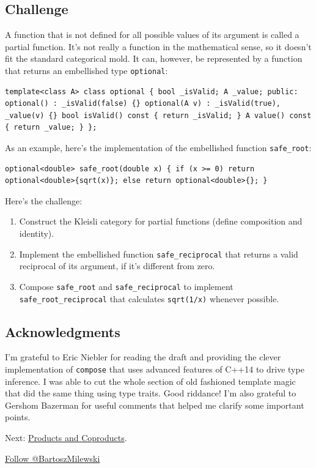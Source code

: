 \subsection{Challenge}\label{challenge}

A function that is not defined for all possible values of its argument
is called a partial function. It's not really a function in the
mathematical sense, so it doesn't fit the standard categorical mold. It
can, however, be represented by a function that returns an embellished
type \texttt{optional}:

\begin{verbatim}
template<class A> class optional { bool _isValid; A _value; public: optional() : _isValid(false) {} optional(A v) : _isValid(true), _value(v) {} bool isValid() const { return _isValid; } A value() const { return _value; } };
\end{verbatim}

As an example, here's the implementation of the embellished function
\texttt{safe\_root}:

\begin{verbatim}
optional<double> safe_root(double x) { if (x >= 0) return optional<double>{sqrt(x)}; else return optional<double>{}; }
\end{verbatim}

Here's the challenge:

\begin{enumerate}
\tightlist
\item
  Construct the Kleisli category for partial functions (define
  composition and identity).
\item
  Implement the embellished function \texttt{safe\_reciprocal} that
  returns a valid reciprocal of its argument, if it's different from
  zero.
\item
  Compose \texttt{safe\_root} and \texttt{safe\_reciprocal} to implement
  \texttt{safe\_root\_reciprocal} that calculates \texttt{sqrt(1/x)}
  whenever possible.
\end{enumerate}

\subsection{Acknowledgments}\label{acknowledgments}

I'm grateful to Eric Niebler for reading the draft and providing the
clever implementation of \texttt{compose} that uses advanced features of
C++14 to drive type inference. I was able to cut the whole section of
old fashioned template magic that did the same thing using type traits.
Good riddance! I'm also grateful to Gershom Bazerman for useful comments
that helped me clarify some important points.

Next:
\href{https://bartoszmilewski.com/2015/01/07/products-and-coproducts/}{Products
and Coproducts}.

\href{https://twitter.com/BartoszMilewski}{Follow @BartoszMilewski}
